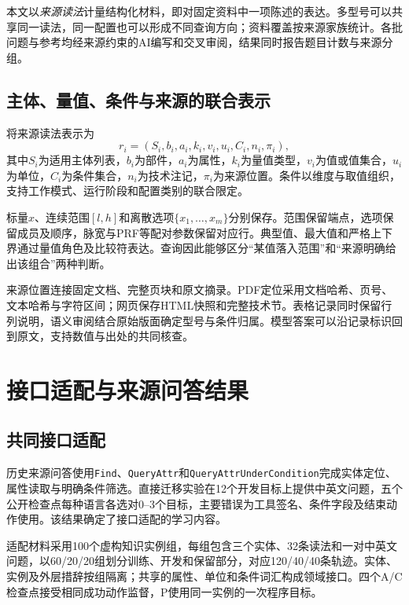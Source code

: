 本文以\emph{来源读法}计量结构化材料，即对固定资料中一项陈述的表达。多型号可以共享同一读法，同一配置也可以形成不同查询方向；资料覆盖按来源家族统计。各批问题与参考均经来源约束的AI编写和交叉审阅，结果同时报告题目计数与来源分组。

\subsection{主体、量值、条件与来源的联合表示}

将来源读法表示为
\begin{equation}
 r_i=(S_i,b_i,a_i,k_i,v_i,u_i,C_i,n_i,\pi_i),
\label{eq:radar-reading}
\end{equation}
其中$S_i$为适用主体列表，$b_i$为部件，$a_i$为属性，$k_i$为量值类型，$v_i$为值或值集合，$u_i$为单位，$C_i$为条件集合，$n_i$为技术注记，$\pi_i$为来源位置。条件以维度与取值组织，支持工作模式、运行阶段和配置类别的联合限定。

标量$x$、连续范围$[l,h]$和离散选项$\{x_1,\ldots,x_m\}$分别保存。范围保留端点，选项保留成员及顺序，脉宽与PRF等配对参数保留对应行。典型值、最大值和严格上下界通过量值角色及比较符表达。查询因此能够区分“某值落入范围”和“来源明确给出该组合”两种判断。

来源位置连接固定文档、完整页块和原文摘录。PDF定位采用文档哈希、页号、文本哈希与字符区间；网页保存HTML快照和完整技术节。表格记录同时保留行列说明，语义审阅结合原始版面确定型号与条件归属。模型答案可以沿记录标识回到原文，支持数值与出处的共同核查。




\section{接口适配与来源问答结果}

\subsection{共同接口适配}

历史来源问答使用\texttt{Find}、\texttt{QueryAttr}和\texttt{QueryAttrUnderCondition}完成实体定位、属性读取与明确条件筛选。直接迁移实验在12个开发目标上提供中英文问题，五个公开检查点每种语言各选对0--3个目标，主要错误为工具签名、条件字段及结束动作使用。该结果确定了接口适配的学习内容。

适配材料采用100个虚构知识实例组，每组包含三个实体、32条读法和一对中英文问题，以60/20/20组划分训练、开发和保留部分，对应120/40/40条轨迹。实体、实例及外层措辞按组隔离；共享的属性、单位和条件词汇构成领域接口。四个A/C检查点接受相同成功动作监督，P使用同一实例的一次程序目标。

